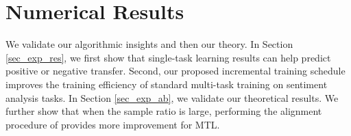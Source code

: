 \section{Numerical Results}

We validate our  algorithmic insights and then our theory.
In Section \ref{sec_exp_res}, we first show that single-task learning results can help predict positive or negative transfer.
Second, our proposed incremental training schedule improves the training efficiency of standard multi-task training on sentiment analysis tasks.
In Section \ref{sec_exp_ab}, we validate our theoretical results.
We further show that when the sample ratio is large, performing the alignment procedure of \cite{WZR20} provides more improvement for MTL.

